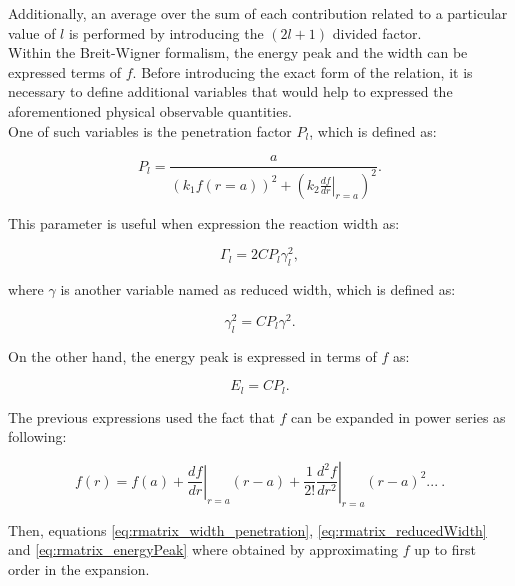 \documentclass[openany]{book}
\begin{document}
Additionally, an average over the sum of each contribution related to a particular value of $l$ is performed by introducing the $(2l +1)$ divided factor. \\

Within the Breit-Wigner formalism, the energy peak and the width can be expressed terms of $f$. Before introducing the exact form of the relation, it is necessary to define additional variables that would help to expressed the aforementioned physical observable quantities.  \\

One of such variables is the penetration factor $P_l$, which is defined as: 

\begin{equation}  \label{eq:rmatrix_penetrationFactor}
	P_l = \frac{a}{(k_1 f(r = a ))^2 + \left(k_2 \left.\frac{df}{dr}\right|_{r = a} \right)^2 }.
\end{equation}

This parameter is useful when expression the reaction width as: 

\begin{equation}   \label{eq:rmatrix_width_penetration}
	\Gamma_l = 2CP_l\gamma^2_l,
\end{equation}

where $\gamma$ is another variable named as reduced width,  which is defined as: 

\begin{equation}   \label{eq:rmatrix_reducedWidth}
	\gamma^2_l =C P_l\gamma^2.
\end{equation}

On the other hand, the energy peak is expressed in terms of $f$ as: 

\begin{equation}  \label{eq:rmatrix_energyPeak}
	E_l =  C P_l.
\end{equation}

The previous expressions used the fact that $f$ can be expanded in power series as following: 

\begin{equation}   \label{eq:rmatrix_f_powerSeries}
	f(r) = f(a) + \left.\frac{df}{dr}\right|_{r = a} (r - a) +  \frac{1}{2!} \left.\frac{d^2f}{dr^2}\right|_{r = a} (r - a )^2  ... \ .
\end{equation}

Then, equations \ref{eq:rmatrix_width_penetration},     \ref{eq:rmatrix_reducedWidth} and \ref{eq:rmatrix_energyPeak} where obtained by approximating $f$ up to first order in the expansion.\\
\end{document}
